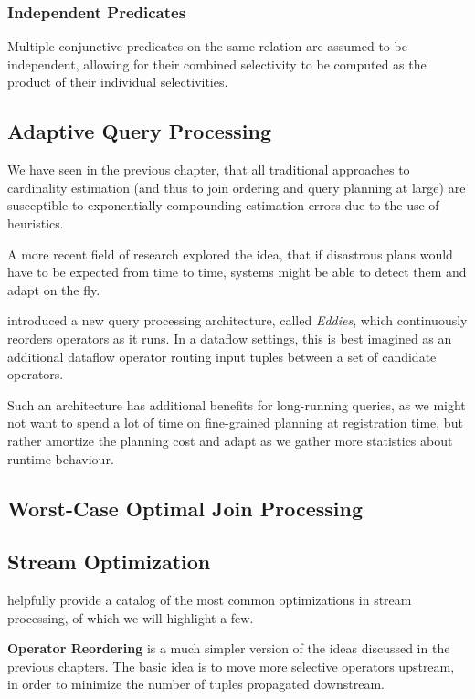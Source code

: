\documentclass[../index.tex]{subfiles}
\begin{document}
\subsubsection{Independent Predicates}

Multiple conjunctive predicates on the same relation are assumed to be
independent, allowing for their combined selectivity to be computed as
the product of their individual selectivities.

\subsection{Adaptive Query Processing}

We have seen in the previous chapter, that all traditional approaches
to cardinality estimation (and thus to join ordering and query
planning at large) are susceptible to exponentially compounding
estimation errors due to the use of heuristics.

A more recent field of research explored the idea, that if disastrous
plans would have to be expected from time to time, systems might be
able to detect them and adapt on the fly.

\cite{avnur2000eddies} introduced a new query processing architecture,
called \emph{Eddies}, which continuously reorders operators as it
runs. In a dataflow settings, this is best imagined as an additional
dataflow operator routing input tuples between a set of candidate
operators.

Such an architecture has additional benefits for long-running queries,
as we might not want to spend a lot of time on fine-grained planning
at registration time, but rather amortize the planning cost and adapt
as we gather more statistics about runtime behaviour.

\subsection{Worst-Case Optimal Join Processing}

\subsection{Stream Optimization}

\cite{hirzel2014catalog} helpfully provide a catalog of the most
common optimizations in stream processing, of which we will highlight
a few.

\textbf{Operator Reordering} is a much simpler version of the ideas
discussed in the previous chapters. The basic idea is to move more
selective operators upstream, in order to minimize the number of
tuples propagated downstream.
\end{document}
